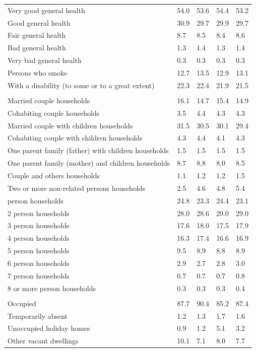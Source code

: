 \documentclass{article}
\begin{document}
\begin{table}[h]
\begin{tabular}{KTTTT}
    \hline
Very good general health & 54.0& 53.6&54.4& 53.2\\
Good general health & 30.9& 29.7& 29.9& 29.7\\
Fair general health & 8.7& 8.5&8.4& 8.6\\
Bad general health & 1.3& 1.4&1.3& 1.4\\
Very bad general health & 0.3& 0.3&0.3& 0.3\\
    \hline
Persons who smoke & 12.7& 13.5&12.9& 13.1\\
    \hline
With a disability (to some or to a great extent) & 22.3& 22.4&21.9& 21.5\\
\hline
    \\ 
    \hline
Married couple households & 16.1& 14.7& 15.4& 14.9\\
Cohabiting couple households & 3.5& 4.4& 4.3& 4.3\\
Married couple with children households & 31.5& 30.5& 30.1& 29.4\\
Cohabiting couple with children households & 4.3& 4.4& 4.1& 4.3\\
One parent family (father) with  children households & 1.5& 1.5& 1.5& 1.5\\
One parent family (mother) and children households & 8.7& 8.8& 8.0& 8.5\\
Couple and others households  & 1.1& 1.2& 1.2& 1.5\\
Two or more non-related persons households & 2.5& 4.6& 4.8& 5.4\\
     person households & 24.8& 23.3& 24.4& 23.1\\
2 person households & 28.0& 28.6& 29.0& 29.0\\
3 person households & 17.6& 18.0& 17.5& 17.9\\
4 person households & 16.3& 17.4& 16.6& 16.9\\
5 person households & 9.5& 8.9& 8.8& 8.9\\
6 person households & 2.9& 2.7& 2.8& 3.0\\
7 person households & 0.7& 0.7& 0.7& 0.8\\
8 or more person households & 0.3& 0.3& 0.3& 0.4\\
\hline
    \\ 
    \hline
Occupied & 87.7& 90.4& 85.2& 87.4\\
Temporarily absent & 1.2& 1.3& 1.7& 1.6\\
Unoccupied holiday homes & 0.9& 1.2& 5.1& 3.2\\
Other vacant dwellings & 10.1&  7.1&  8.0&  7.7\\
\hline
\end{tabular}
\end{table}
\end{document}
